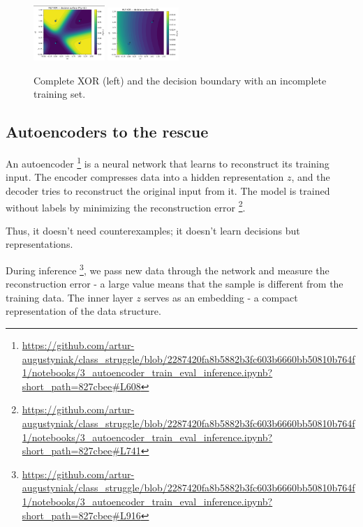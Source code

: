 \documentclass[twocolumn,9pt]{extarticle}
\begin{document}
\vspace{-9pt}
\begin{figure}[h!]
    \includegraphics[width=0.24\textwidth]{img/balanced_set.png}
    \includegraphics[width=0.24\textwidth]{img/unbalanced_set.png}
    \caption{Complete XOR (left) and the decision boundary with an incomplete training set.}
    
\end{figure}
\vspace{-6pt}

\vspace{-9pt}
\subsection*{Autoencoders to the rescue}
\vspace{-6pt}

An autoencoder \footnote{\url{https://github.com/artur-augustyniak/class_struggle/blob/2287420fa8b5882b3fc603b6660bb50810b764f1/notebooks/3_autoencoder_train_eval_inference.ipynb?short_path=827cbee\#L608}} is a neural network that learns to reconstruct its training input. 
The encoder compresses data into a hidden representation $z$, and the decoder tries to reconstruct the original input from it. 
The model is trained without labels by minimizing the reconstruction error \footnote{\url{https://github.com/artur-augustyniak/class_struggle/blob/2287420fa8b5882b3fc603b6660bb50810b764f1/notebooks/3_autoencoder_train_eval_inference.ipynb?short_path=827cbee\#L741}}.

Thus, it doesn’t need counterexamples; it doesn’t learn decisions but representations.

During inference \footnote{\url{https://github.com/artur-augustyniak/class_struggle/blob/2287420fa8b5882b3fc603b6660bb50810b764f1/notebooks/3_autoencoder_train_eval_inference.ipynb?short_path=827cbee\#L916}}, we pass new data through the network and measure the reconstruction error - 
a large value means that the sample is different from the training data.
The inner layer $z$ serves as an embedding - a compact representation of the data structure.
\end{document}
